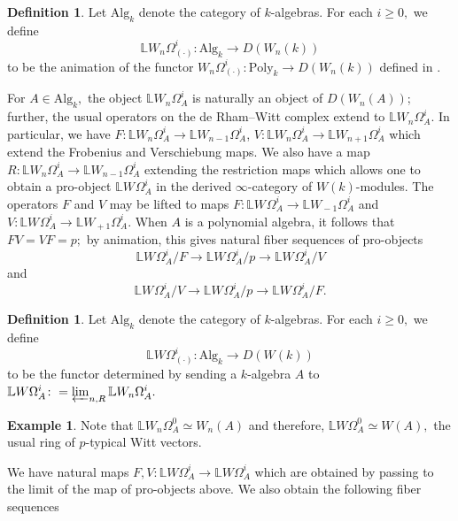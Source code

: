 \documentclass[10pt,letterpaper]{amsart}
\makeatletter
\newcommand{\smallbullet}{} %
\DeclareRobustCommand\smallbullet{%
  \mathord{\mathpalette\smallbullet@{0.7}}%
}
\newcommand{\smallbullet@}[2]{%
  \vcenter{\hbox{\scalebox{#2}{$\m@th#1\bullet$}}}%
}
\numberwithin{figure}{section}
\numberwithin{equation}{section}
\theoremstyle{definition}
\newtheorem{definition}[figure]{Definition}
\theoremstyle{definition}
\theoremstyle{definition}
\newtheorem{example}[figure]{Example}
\theoremstyle{definition}
\newcommand{\LL}{\L}
\renewcommand{\L}{\mathbb{L}}
\makeatother
\begin{document}
\begin{definition}
    Let $\mathrm{Alg}_k$ denote the category of $k$-algebras. For each $i \ge 0,$ we define $$\L W_n \Omega^i_{(\cdot)}\colon \mathrm{Alg}_k \to D(W_n(k))$$ to be the animation of the functor $W_n \Omega^i_{(\cdot)}\colon \mathrm{Poly}_k \to D(W_n(k))$ defined in \cite{Luc1}.
\end{definition}{}
For $A \in \mathrm{Alg}_k,$ the object $\LL W_n \Omega^i_A$ is naturally an object of $D(W_n(A))$; further, the usual operators on the de Rham--Witt complex extend to $\L W_n \Omega^i_A.$ In particular, we have $F\colon \L W_n \Omega^i _A\to \L W_{n-1} \Omega^{i}_A$, $V\colon \L W_n \Omega^i_A\to \L W_{n+1} \Omega^i_A$ which extend the Frobenius and Verschiebung maps. We also have a map $R\colon \L W_n \Omega^i_A \to \L W_{n-1} \Omega^{i}_A $ extending the restriction maps which allows one to obtain a pro-object $\L W_{\smallbullet} \Omega^i_{A}$ in the derived $\infty$-category of $W(k)$-modules. The operators $F$ and $V$ may be lifted to maps $F \colon \L W_{\smallbullet} \Omega^i_{A} \to \L W_{{\smallbullet}-1} \Omega^i _{A}$ and $V \colon \L W_{\smallbullet} \Omega^i_{A} \to \L W_{{\smallbullet}+1} \Omega^i _{A}.$ When $A$ is a polynomial algebra, it follows that $FV= VF= p;$ by animation, this gives natural fiber sequences of pro-objects
\begin{equation}\label{eq100}
   \L W_{\smallbullet} \Omega^i_A/F \to \L W_{\smallbullet} \Omega^i_A/p \to \L W_{\smallbullet} \Omega^i_A/V
\end{equation}{}
and
\begin{equation}\label{eq101}
   \L W_{\smallbullet} \Omega^i_A/V \to\L W_{\smallbullet} \Omega^i_A/p \to \L W_{\smallbullet} \Omega^i_A/F.
\end{equation}{}
\begin{definition}\label{derhamw}
    Let $\mathrm{Alg}_k$ denote the category of $k$-algebras. For each $i \ge 0,$ we define $$\L W \Omega^i_{(\cdot)}\colon \mathrm{Alg}_k \to D(W(k))$$ to be the functor determined by sending a $k$-algebra $A$ to $\L W\Omega^i_A\colon= \varprojlim _{n,R} \L W_n \Omega^i_A.$ 
\end{definition}{}
\begin{example}
    Note that $\LL W_n \Omega_A^0 \simeq W_n(A)$ and therefore, $\LL W\Omega_A^0 \simeq W(A),$ the usual ring of $p$-typical Witt vectors.
\end{example}{}


We have natural maps $F,V\colon \L W\Omega^i_A \to \L W\Omega^i_A$ which are obtained by passing to the limit of the map of pro-objects above. We also obtain the following fiber sequences 
\end{document}
